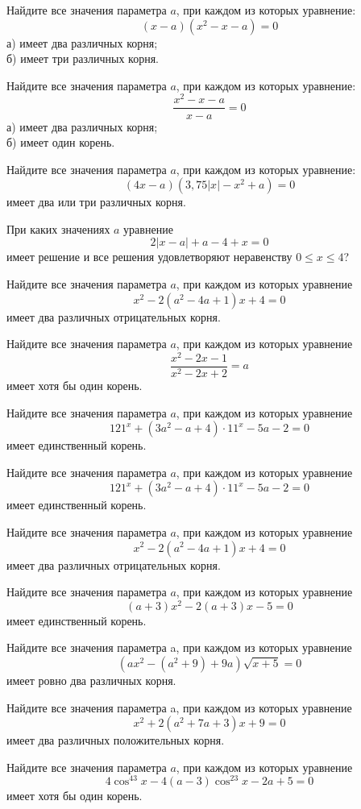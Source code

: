 %
%

\begin{class}[number=1]
	\begin{listofex}
		\item Найдите все значения параметра \( a \), при каждом из которых уравнение:
		\[ (x-a)(x^2-x-a)=0 \]
		а) имеет два различных корня;\\
		б) имеет три различных корня.
		\item Найдите все значения параметра \( a \), при каждом из которых уравнение:
		\[ \dfrac{x^2-x-a}{x-a}=0 \]
		а) имеет два различных корня;\\
		б) имеет один корень.
		\item Найдите все значения параметра \( a \), при каждом из которых уравнение:
		\[ (4x-a)(3,75|x|-x^2+a)=0 \]
		имеет два или три различных корня.
		\item При каких значениях \( a \) уравнение
		\[ 2|x-a|+a-4+x=0 \]
		имеет решение и все решения удовлетворяют неравенству \( 0\le x \le 4 \)?
		\item Найдите все значения параметра \( a \), при каждом из которых уравнение
		\[ x^2-2(a^2-4a+1)x+4=0 \]
		имеет два различных отрицательных корня.
		\item Найдите все значения параметра \( a \), при каждом из которых уравнение
		\[ \dfrac{x^2-2x-1}{x^2-2x+2}=a \]
		имеет хотя бы один корень.
		\item Найдите все значения параметра \( a \), при каждом из которых уравнение
		\[ 121^x+(3a^2-a+4)\cdot11^x-5a-2=0 \]
		имеет единственный корень.
	\end{listofex}
\end{class}

\begin{class}[number=2]
	\begin{listofex}
		\item Найдите все значения параметра \( a \), при каждом из которых уравнение
		\[ 121^x+(3a^2-a+4)\cdot11^x-5a-2=0 \]
		имеет единственный корень.
		\item Найдите все значения параметра \( a \), при каждом из которых уравнение
		\[ x^2-2(a^2-4a+1)x+4=0 \]
		имеет два различных отрицательных корня.
		\item Найдите все значения параметра \( a \), при каждом из которых уравнение
		\[ (a+3)x^2-2(a+3)x-5=0 \] имеет единственный корень.
		\item Найдите все значения параметра a, при каждом из которых
		уравнение
		\[ (ax^2-(a^2+9)+9a)\sqrt{x+5}=0 \]
		имеет ровно два различных корня.
		\item Найдите все значения параметра a, при каждом из которых
		уравнение
		\[ x^2+2(a^2+7a+3)x+9=0 \]
		имеет два различных положительных корня.
		\item Найдите все значения параметра \( a \), при каждом из которых
		уравнение
		\[ 4\cos^43x-4(a-3)\cos^23x-2a+5=0 \]
		имеет хотя бы один корень.
	\end{listofex}
\end{class}

